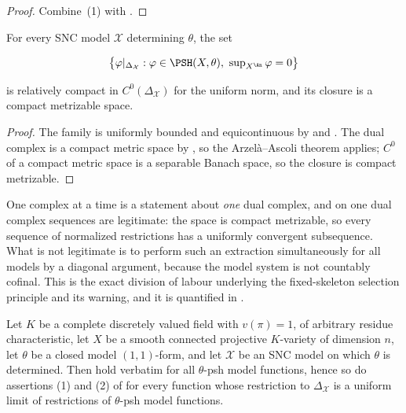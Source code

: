 \begin{proof}
Combine \,(1) with
.
\end{proof}

\begin{corollary}
\label{cor:ch22-arzela-ascoli}
For every SNC model $\mathcal X$ determining $\theta$, the set

\[
 \bigl\{\varphi|_{\Delta_{\mathcal X}}:
        \varphi\in\PSH(X,\theta),\ \sup\nolimits_{X^{\An}}\varphi=0\bigr\}
\]

is relatively compact in $C^0(\Delta_{\mathcal X})$ for the uniform norm,
and its closure is a compact metrizable space.
\end{corollary}

\begin{proof}
The family is uniformly bounded and equicontinuous by
 and
.  The dual complex is a compact metric
space by , so the Arzel\`a--Ascoli theorem
applies; $C^0$ of a compact metric space is a separable Banach space, so
the closure is compact metrizable.
\end{proof}

\begin{warning}{One complex at a time}
 is a statement about \emph{one} dual complex,
and on one dual complex sequences are legitimate: the space is compact
metrizable, so every sequence of normalized restrictions has a uniformly
convergent subsequence.  What is not legitimate is to perform such an
extraction simultaneously for all models by a diagonal argument, because the
model system is not countably cofinal.  This is the exact division of labour
underlying the fixed-skeleton selection principle
 and its warning, and it is
quantified in .
\end{warning}

\begin{proposition}
\label{prop:ch22-characteristic-free-estimates}
Let $K$ be a complete discretely valued field with $v(\pi)=1$, of
arbitrary residue characteristic, let $X$ be a smooth connected projective
$K$-variety of dimension $n$, let $\theta$ be a closed model
$(1,1)$-form, and let $\mathcal X$ be an SNC model on which
$\theta$ is determined.  Then
 hold verbatim for
all $\theta$-psh model functions, hence so do assertions (1) and (2) of
 for every function whose restriction
to $\Delta_{\mathcal X}$ is a uniform limit of restrictions of
$\theta$-psh model functions.
\end{proposition}

